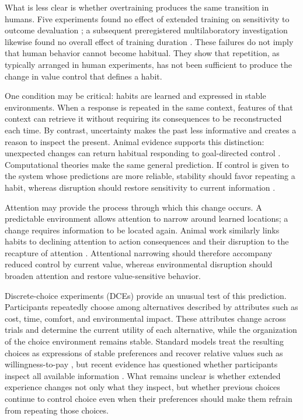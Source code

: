 \documentclass[man,natbib,floatsintext]{apa7}
\begin{document}
What is less clear is whether overtraining produces the same transition in humans. Five experiments found no effect of extended training on sensitivity to outcome devaluation \citep{deWit2018}; a subsequent preregistered multilaboratory investigation likewise found no overall effect of training duration \citep{pool2022}. These failures do not imply that human behavior cannot become habitual. They show that repetition, as typically arranged in human experiments, has not been sufficient to produce the change in value control that defines a habit.

One condition may be critical: habits are learned and expressed in stable environments. When a response is repeated in the same context, features of that context can retrieve it without requiring its consequences to be reconstructed each time. By contrast, uncertainty makes the past less informative and creates a reason to inspect the present. Animal evidence supports this distinction: unexpected changes can return habitual responding to goal-directed control \citep{thrailkill2018,bouton2020,bouton2024}. Computational theories make the same general prediction. If control is given to the system whose predictions are more reliable, stability should favor repeating a habit, whereas disruption should restore sensitivity to current information \citep{daw2005,lee2014}.

Attention may provide the process through which this change occurs. A predictable environment allows attention to narrow around learned locations; a change requires information to be located again. Animal work similarly links habits to declining attention to action consequences and their disruption to the recapture of attention \citep{thrailkill2018,bouton2020,bouton2024}. Attentional narrowing should therefore accompany reduced control by current value, whereas environmental disruption should broaden attention and restore value-sensitive behavior.

Discrete-choice experiments (DCEs) provide an unusual test of this prediction. Participants repeatedly choose among alternatives described by attributes such as cost, time, comfort, and environmental impact. These attributes change across trials and determine the current utility of each alternative, while the organization of the choice environment remains stable. Standard models treat the resulting choices as expressions of stable preferences and recover relative values such as willingness-to-pay \citep{mcfadden1974,train2009}, but recent evidence has questioned whether participants inspect all available information \citep{hole2011,yegoryan2020}. What remains unclear is whether extended experience changes not only what they inspect, but whether previous choices continue to control choice even when their preferences should make them refrain from repeating those choices.
\end{document}
